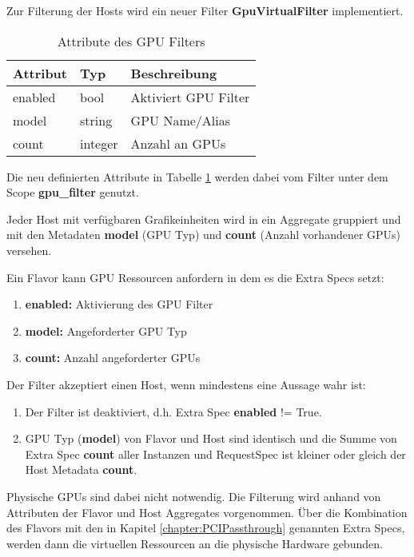 \documentclass[../Main.tex]{subfiles}
\begin{document}
Zur Filterung der Hosts wird ein neuer Filter \textbf{GpuVirtualFilter} implementiert.

\begin{table}[H]
    \centering
    \caption{Attribute des GPU Filters}
    \renewcommand{\arraystretch}{1.2}
    \begin{tabular}{lll}
        \hline
        \textbf{Attribut} & \textbf{Typ} & \textbf{Beschreibung} \\ 
        \hline
        enabled & bool & Aktiviert GPU Filter \\ 
        model & string & GPU Name/Alias \\ 
        count & integer & Anzahl an GPUs \\ 
        \hline
    \end{tabular}
    \label{table:FilterAttributes}
\end{table}

Die neu definierten Attribute in Tabelle \ref{table:FilterAttributes} werden dabei vom Filter unter dem Scope \textbf{gpu\_filter} genutzt.

Jeder Host mit verfügbaren Grafikeinheiten wird in ein Aggregate gruppiert und mit den Metadaten \textbf{model} (GPU Typ) und \textbf{count} (Anzahl vorhandener GPUs) versehen.

Ein Flavor kann GPU Ressourcen anfordern in dem es die Extra Specs setzt:

\begin{enumerate}
    \item \textbf{enabled:} Aktivierung des GPU Filter
    \item \textbf{model:} Angeforderter GPU Typ
    \item \textbf{count:} Anzahl angeforderter GPUs
\end{enumerate}

Der Filter akzeptiert einen Host, wenn mindestens eine Aussage wahr ist:

\begin{enumerate}
    \item Der Filter ist deaktiviert, d.h. Extra Spec \textbf{enabled} != True.
    \item GPU Typ (\textbf{model}) von Flavor und Host sind identisch und
    die Summe von Extra Spec \textbf{count} aller Instanzen und RequestSpec ist kleiner oder gleich der Host Metadata \textbf{count}.
\end{enumerate}

Physische GPUs sind dabei nicht notwendig. Die Filterung wird anhand von Attributen der Flavor und Host Aggregates vorgenommen.
Über die Kombination des Flavors mit den in Kapitel \ref{chapter:PCIPassthrough} genannten Extra Specs, werden dann die virtuellen Ressourcen
an die physische Hardware gebunden.
\end{document}

